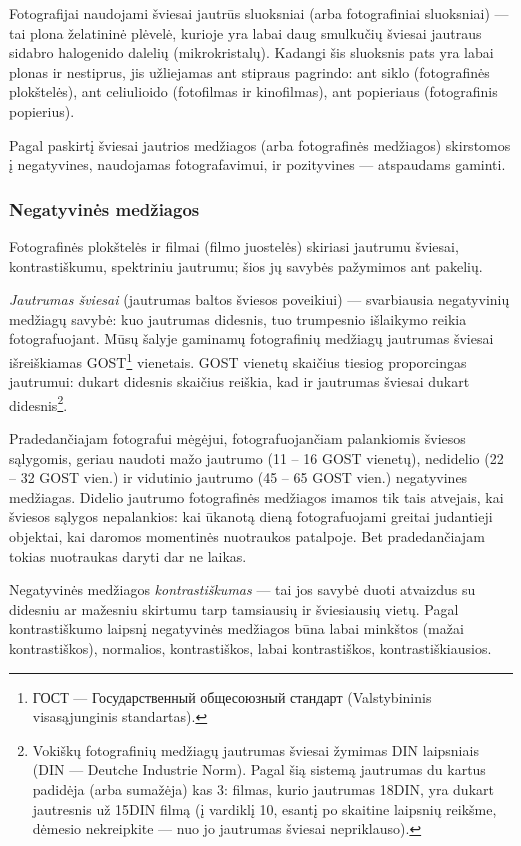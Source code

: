 \documentclass{book}
\begin{document}
				Fotografijai naudojami šviesai jautrūs sluoksniai (arba fotografiniai sluoksniai) --- tai plona želatininė plėvelė, kurioje yra labai daug smulkučių šviesai jautraus sidabro halogenido dalelių (mikrokristalų). Kadangi šis sluoksnis pats yra labai plonas ir nestiprus, jis užliejamas ant stipraus pagrindo: ant siklo (fotografinės plokštelės), ant celiulioido (fotofilmas ir kinofilmas), ant popieriaus (fotografinis popierius).

				Pagal paskirtį šviesai jautrios medžiagos (arba fotografinės medžiagos) skirstomos į negatyvines, naudojamas fotografavimui, ir pozityvines --- atspaudams gaminti.

				\subsubsection*{Negatyvinės medžiagos}
					Fotografinės plokštelės ir filmai (filmo juostelės) skiriasi jautrumu šviesai, kontrastiškumu, spektriniu jautrumu; šios jų savybės pažymimos ant pakelių.

					\textit{Jautrumas šviesai} (jautrumas baltos šviesos poveikiui) --- svarbiausia negatyvinių medžiagų savybė: kuo jautrumas didesnis, tuo trumpesnio išlaikymo reikia fotografuojant. Mūsų šalyje gaminamų fotografinių medžiagų jautrumas šviesai išreiškiamas GOST\footnote{ГОСТ --- Государственный общесоюзный стандарт (Valstybininis visasąjunginis standartas).} vienetais. GOST vienetų skaičius tiesiog proporcingas jautrumui: dukart didesnis skaičius reiškia, kad ir jautrumas šviesai dukart didesnis\footnote{Vokiškų fotografinių medžiagų jautrumas šviesai žymimas DIN laipsniais (DIN --- Deutche Industrie Norm). Pagal šią sistemą jautrumas du kartus padidėja (arba sumažėja) kas 3\degree: filmas, kurio jautrumas 18\degree DIN, yra dukart jautresnis už 15\degree DIN filmą (į vardiklį 10, esantį po skaitine laipsnių reikšme, dėmesio nekreipkite --- nuo jo jautrumas šviesai nepriklauso).}.

					Pradedančiajam fotografui mėgėjui, fotografuojančiam palankiomis šviesos sąlygomis, geriau naudoti mažo jautrumo (11 -- 16 GOST vienetų), nedidelio (22 -- 32 GOST vien.) ir vidutinio jautrumo (45 -- 65 GOST vien.) negatyvines medžiagas. Didelio jautrumo fotografinės medžiagos imamos tik tais atvejais, kai šviesos sąlygos nepalankios: kai ūkanotą dieną fotografuojami greitai judantieji objektai, kai daromos momentinės nuotraukos patalpoje. Bet pradedančiajam tokias nuotraukas daryti dar ne laikas.

					Negatyvinės medžiagos \textit{kontrastiškumas} --- tai jos savybė duoti atvaizdus su didesniu ar mažesniu skirtumu tarp tamsiausių ir šviesiausių vietų. Pagal kontrastiškumo laipsnį negatyvinės medžiagos būna labai minkštos (mažai kontrastiškos), normalios, kontrastiškos, labai kontrastiškos, kontrastiškiausios.
\end{document}
